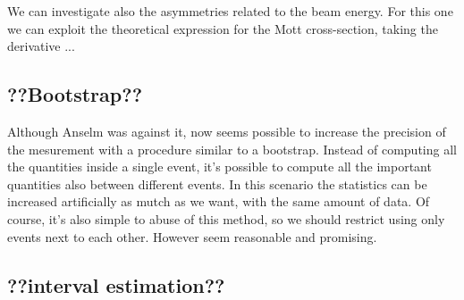 We can investigate also the asymmetries related to the beam energy. For this one we can exploit the theoretical expression for the Mott cross-section, taking the derivative ...

\subsection{??Bootstrap??}

Although Anselm was against it, now seems possible to increase the precision of the mesurement with a procedure similar to a bootstrap. Instead of computing all the quantities inside a single event, it's possible to compute all the important quantities also between different events. In this scenario the statistics can be increased artificially as mutch as we want, with the same amount of data. Of course, it's also simple to abuse of this method, so we should restrict using only events next to each other. However seem reasonable and promising.

\subsection{??interval estimation??}




